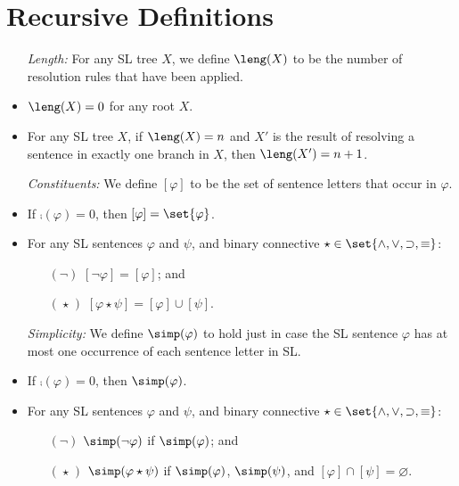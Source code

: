 
\section*{Recursive Definitions}

\begin{itemize}
  \item[\it Length:] For any SL tree $X$, we define $\leng(X)$ to be the number of resolution rules that have been applied.
      \item $\leng(X)=0$ for any root $X$.
      \item For any SL tree $X$, if $\leng(X)=n$ and $X'$ is the result of resolving a sentence in exactly one branch in $X$, then $\leng(X')=n+1$.
  \item[\it Constituents:] We define $[\varphi]$ to be the set of sentence letters that occur in $\varphi$. %
      \item If $\comp(\varphi)=0$, then $[\varphi]=\set{\varphi}$.
      \item For any SL sentences $\varphi$ and $\psi$, and binary connective $\star\in\set{\wedge,\vee,\supset,\equiv}$: 
    \begin{itemize}
      \item[$(\neg)$] $[\neg \varphi]=[\varphi]$; and
      \item[$(\hspace{1pt}\star\hspace{1pt})$] $[\varphi \star \psi]=[\varphi] \cup [\psi]$.
    \end{itemize}
  \item[\it Simplicity:] We define $\simp(\varphi)$ to hold just in case the SL sentence $\varphi$ has at most one occurrence of each sentence letter in SL.
      \item If $\comp(\varphi)=0$, then $\simp(\varphi)$.
      \item For any SL sentences $\varphi$ and $\psi$, and binary connective $\star\in\set{\wedge,\vee,\supset,\equiv}$: 
    \begin{itemize}
      \item[$(\neg)$] $\simp(\neg \varphi)$ if $\simp(\varphi)$; and
      \item[$(\hspace{1pt}\star\hspace{1pt})$] $\simp(\varphi \star \psi)$ if $\simp(\varphi)$, $\simp(\psi)$, and $[\varphi]\cap[\psi]=\varnothing$.
    \end{itemize}

\end{itemize}
